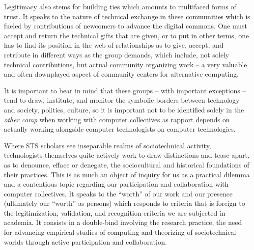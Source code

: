 \documentclass[10pt,letter,oneside]{scrartcl}
\begin{document}
Legitimacy also stems for building ties which amounts to multifaced
forms of trust. It speaks to the nature of technical exchange in these
communities which is fueled by contributions of newcomers to advance
the digital commons. One must accept and return the technical gifts
that are given, or to put in other terms, one has to find its position
in the web of relationships as to give, accept, and retribute in
different ways as the group demands, which include, not solely
technical contributions, but actual community organizing work -- a
very valuable and often downplayed aspect of community centers for
alternative computing.



  It is important to bear in mind that these groups -- with important
  exceptions -- tend to draw, institute, and monitor the symbolic
  borders between technology and society, politics, culture, so it is
  important not to be identified solely in the \emph{other camp} when
  working with computer collectives as rapport depends on actually
  working alongside computer technologists on computer
  technologies. %

  Where STS scholars see inseparable realms of sociotechnical
  activity, technologists themselves quite actively work to draw
  distinctions and tease apart, as to denounce, efface or denegate,
  the sociocultural and historical foundations of their
  practices. This is as much an object of inquiry for us as a
  practical dilemma and a contentious topic regarding our
  participation and collaboration with computer collectives. It speaks
  to the ``worth'' of our work and our presence (ultimately our
  ``worth'' as persons) which responds to criteria that is foreign to
  the legitimization, validation, and recognition criteria we are
  subjected in academia. It consists in a double-bind involving the
  research practice, the need for advancing empirical studies of
  computing and theorizing of sociotechnical worlds through active
  participation and collaboration.
\end{document}
